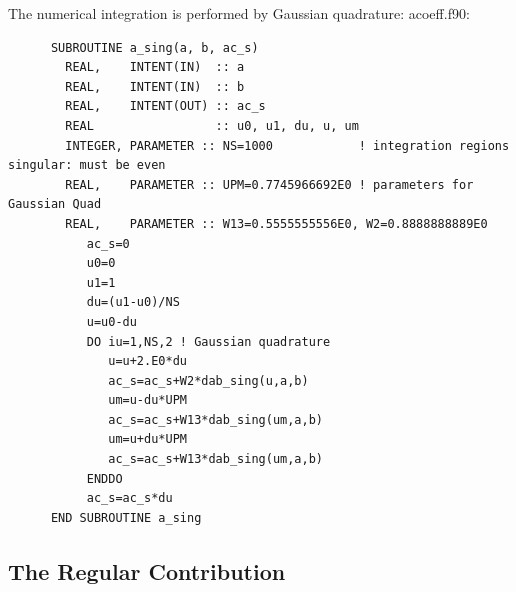 \documentclass[preprint,12pt,eqsecnum,nofootinbib,amsmath,amssymb]{revtex4}
\begin{document}
\noindent
The numerical integration is performed by Gaussian quadrature:
\vskip0.4cm 
\noindent
acoeff.f90:
{
\baselineskip 10pt
\begin{verbatim}
      SUBROUTINE a_sing(a, b, ac_s)
        REAL,    INTENT(IN)  :: a
        REAL,    INTENT(IN)  :: b
        REAL,    INTENT(OUT) :: ac_s
        REAL                 :: u0, u1, du, u, um
        INTEGER, PARAMETER :: NS=1000            ! integration regions singular: must be even
        REAL,    PARAMETER :: UPM=0.7745966692E0 ! parameters for Gaussian Quad
        REAL,    PARAMETER :: W13=0.5555555556E0, W2=0.8888888889E0
           ac_s=0
           u0=0
           u1=1
           du=(u1-u0)/NS
           u=u0-du
           DO iu=1,NS,2 ! Gaussian quadrature
              u=u+2.E0*du
              ac_s=ac_s+W2*dab_sing(u,a,b)
              um=u-du*UPM
              ac_s=ac_s+W13*dab_sing(um,a,b)
              um=u+du*UPM
              ac_s=ac_s+W13*dab_sing(um,a,b)
           ENDDO
           ac_s=ac_s*du
      END SUBROUTINE a_sing
\end{verbatim}
}


\subsection{The Regular Contribution}
\end{document}
